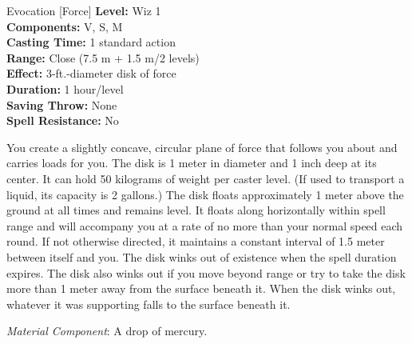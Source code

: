 {Evocation [Force]}
{
	\textbf{Level:}
	Wiz 1\\
	\textbf{Components:}
	V, S, M\\
	\textbf{Casting Time:}
	1 standard action\\
	\textbf{Range:}
	Close (7.5 m + 1.5 m/2 levels)\\
	\textbf{Effect:}
	3-ft.-diameter disk of force\\
	\textbf{Duration:}
	1 hour/level\\
	\textbf{Saving Throw:}
	None\\
	\textbf{Spell Resistance:}
	No\\
}
{
	You create a slightly concave, circular plane of force that follows you about and carries loads for you. The disk is 1 meter in diameter and 1 inch deep at its center. It can hold 50 kilograms of weight per caster level. (If used to transport a liquid, its capacity is 2 gallons.) The disk floats approximately 1 meter above the ground at all times and remains level. It floats along horizontally within spell range and will accompany you at a rate of no more than your normal speed each round. If not otherwise directed, it maintains a constant interval of 1.5 meter between itself and you. The disk winks out of existence when the spell duration expires. The disk also winks out if you move beyond range or try to take the disk more than 1 meter away from the surface beneath it. When the disk winks out, whatever it was supporting falls to the surface beneath it.

	\textit{Material Component}:
	A drop of mercury.

}
